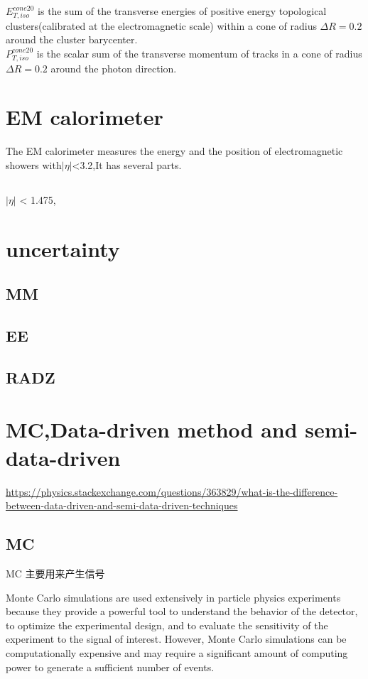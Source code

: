 \documentclass{ctexart}
\begin{document}
$E_{T,iso}^{cone20}$ is the sum of the transverse energies of positive energy topological clusters(calibrated at the electromagnetic scale) within a cone of radius $\Delta R=0.2$ around the cluster barycenter.\\

$P_{T,iso}^{cone20}$ is the scalar sum of the transverse momentum of tracks in a cone of radius $\Delta R=0.2$ around the photon direction.
\section{EM calorimeter}
The EM calorimeter measures
the energy and the position of electromagnetic showers
with$|\eta|$<3.2,It has several parts.
\subsection{}
$|\eta|$ < 1.475,
\section{uncertainty}
\subsection{MM}

\subsection{EE}
\subsection{RADZ}

\section{MC,Data-driven method and semi-data-driven}
\url{https://physics.stackexchange.com/questions/363829/what-is-the-difference-between-data-driven-and-semi-data-driven-techniques}
\subsection{MC}
MC 主要用来产生信号\newline

Monte Carlo simulations are used extensively in particle physics experiments because they provide a powerful tool to understand the behavior of the detector, to optimize the experimental design, and to evaluate the sensitivity of the experiment to the signal of interest. However, Monte Carlo simulations can be computationally expensive and may require a significant amount of computing power to generate a sufficient number of events.
\end{document}

